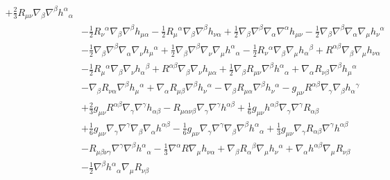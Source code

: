 \documentclass[10pt,letterpaper]{article}
\begin{document}
\begin{align}
 + \tfrac{2}{3} R_{\mu \nu} \nabla_{\beta}\nabla^{\beta}h^{\alpha}{}_{\alpha}\nonumber\\
& -  \tfrac{1}{2} R_{\nu}{}^{\alpha} \nabla_{\beta}\nabla^{\beta}h_{\mu \alpha}
 -  \tfrac{1}{2} R_{\mu}{}^{\alpha} \nabla_{\beta}\nabla^{\beta}h_{\nu \alpha}
 + \tfrac{1}{2} \nabla_{\beta}\nabla^{\beta}\nabla_{\alpha}\nabla^{\alpha}h_{\mu \nu}
 -  \tfrac{1}{2} \nabla_{\beta}\nabla^{\beta}\nabla_{\alpha}\nabla_{\mu}h_{\nu}{}^{\alpha}\nonumber\\
& -  \tfrac{1}{2} \nabla_{\beta}\nabla^{\beta}\nabla_{\alpha}\nabla_{\nu}h_{\mu}{}^{\alpha}
 + \tfrac{1}{2} \nabla_{\beta}\nabla^{\beta}\nabla_{\nu}\nabla_{\mu}h^{\alpha}{}_{\alpha}
 -  \tfrac{1}{2} R_{\nu}{}^{\alpha} \nabla_{\beta}\nabla_{\mu}h_{\alpha}{}^{\beta}
 + R^{\alpha \beta} \nabla_{\beta}\nabla_{\mu}h_{\nu \alpha}\nonumber\\
& -  \tfrac{1}{2} R_{\mu}{}^{\alpha} \nabla_{\beta}\nabla_{\nu}h_{\alpha}{}^{\beta}
 + R^{\alpha \beta} \nabla_{\beta}\nabla_{\nu}h_{\mu \alpha}
 + \tfrac{1}{2} \nabla_{\beta}R_{\mu \nu} \nabla^{\beta}h^{\alpha}{}_{\alpha}
 + \nabla_{\alpha}R_{\nu \beta} \nabla^{\beta}h_{\mu}{}^{\alpha}\nonumber\\
& -  \nabla_{\beta}R_{\nu \alpha} \nabla^{\beta}h_{\mu}{}^{\alpha}
 + \nabla_{\alpha}R_{\mu \beta} \nabla^{\beta}h_{\nu}{}^{\alpha}
 -  \nabla_{\beta}R_{\mu \alpha} \nabla^{\beta}h_{\nu}{}^{\alpha}
 -  g_{\mu \nu} R^{\alpha \beta} \nabla_{\gamma}\nabla_{\beta}h_{\alpha}{}^{\gamma}\nonumber\\
& + \tfrac{2}{3} g_{\mu \nu} R^{\alpha \beta} \nabla_{\gamma}\nabla^{\gamma}h_{\alpha \beta}
 -  R_{\mu \alpha \nu \beta} \nabla_{\gamma}\nabla^{\gamma}h^{\alpha \beta}
 + \tfrac{1}{6} g_{\mu \nu} h^{\alpha \beta} \nabla_{\gamma}\nabla^{\gamma}R_{\alpha \beta}\nonumber\\
& + \tfrac{1}{6} g_{\mu \nu} \nabla_{\gamma}\nabla^{\gamma}\nabla_{\beta}\nabla_{\alpha}h^{\alpha \beta}
 -  \tfrac{1}{6} g_{\mu \nu} \nabla_{\gamma}\nabla^{\gamma}\nabla_{\beta}\nabla^{\beta}h^{\alpha}{}_{\alpha}
 + \tfrac{1}{3} g_{\mu \nu} \nabla_{\gamma}R_{\alpha \beta} \nabla^{\gamma}h^{\alpha \beta}\nonumber\\
& -  R_{\mu \beta \nu \gamma} \nabla^{\gamma}\nabla^{\beta}h^{\alpha}{}_{\alpha}
 -  \tfrac{1}{3} \nabla^{\alpha}R \nabla_{\mu}h_{\nu \alpha}
 + \nabla_{\beta}R_{\alpha}{}^{\beta} \nabla_{\mu}h_{\nu}{}^{\alpha}
 + \nabla_{\alpha}h^{\alpha \beta} \nabla_{\mu}R_{\nu \beta}\nonumber\\
& -  \tfrac{1}{2} \nabla^{\beta}h^{\alpha}{}_{\alpha} \nabla_{\mu}R_{\nu \beta}

\end{align}
\end{document}

